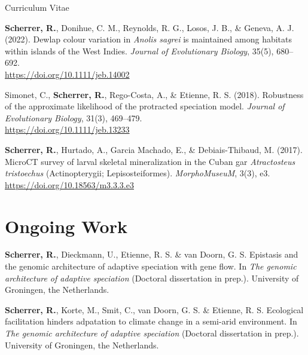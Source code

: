 \documentclass[11pt,a4paper]{article}
\begin{document}
\begin{cv}{Curriculum Vitae}
		\begin{cvlist}{}
			
			\item \textbf{Scherrer, R.}, Donihue, C. M., Reynolds, R. G., Losos, J. B., \& Geneva, A. J. (2022). Dewlap colour variation in \textit{Anolis sagrei} is maintained among habitats within islands of the West Indies. \textit{Journal of Evolutionary Biology}, 35(5), 680–692.\\ \url{https://doi.org/10.1111/jeb.14002}
			
			\item Simonet, C., \textbf{Scherrer, R.}, Rego-Costa, A., \& Etienne, R. S. (2018). Robustness of the approximate likelihood of the protracted speciation model. \textit{Journal of Evolutionary Biology}, 31(3), 469–479.\\ \url{https://doi.org/10.1111/jeb.13233}
			
			\item \textbf{Scherrer, R.}, Hurtado, A., Garcia Machado, E., \& Debiais-Thibaud, M. (2017). MicroCT survey of larval skeletal mineralization in the Cuban gar \textit{Atractosteus tristoechus} (Actinopterygii; Lepisosteiformes). \textit{MorphoMuseuM}, 3(3), e3.\\ \url{https://doi.org/10.18563/m3.3.3.e3}
			
		\end{cvlist}

        \section{Ongoing Work}

        \begin{cvlist}{}

            \item[]
            \textbf{Scherrer, R.}, Dieckmann, U., Etienne, R. S. \& van Doorn, G. S. Epistasis and the genomic architecture of adaptive speciation with gene flow. In \textit{The genomic architecture of adaptive speciation} (Doctoral dissertation in prep.). University of Groningen, the Netherlands.

            \item[]
            \textbf{Scherrer, R.}, Korte, M., Smit, C., van Doorn, G. S. \& Etienne, R. S. Ecological facilitation hinders adpatation to climate change in a semi-arid environment.  In \textit{The genomic architecture of adaptive speciation} (Doctoral dissertation in prep.). University of Groningen, the Netherlands.


\end{cvlist}
\end{cv}
\end{document}
